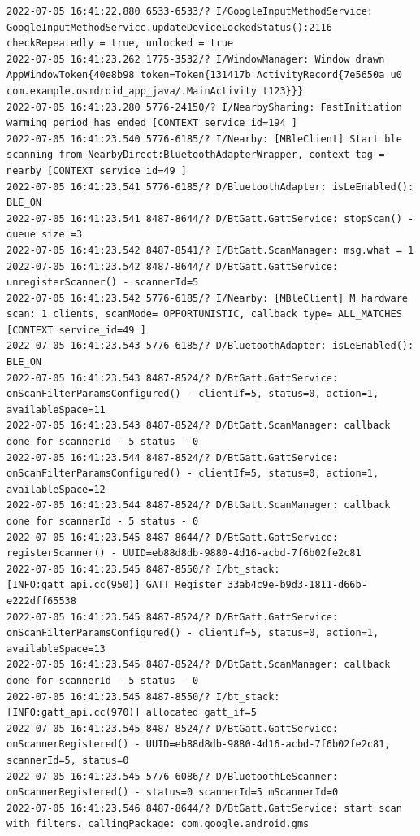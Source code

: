 \documentclass[a4paper,12pt]{book}
\begin{document}
\begin{lstlisting}
2022-07-05 16:41:22.880 6533-6533/? I/GoogleInputMethodService: GoogleInputMethodService.updateDeviceLockedStatus():2116 checkRepeatedly = true, unlocked = true
2022-07-05 16:41:23.262 1775-3532/? I/WindowManager: Window drawn AppWindowToken{40e8b98 token=Token{131417b ActivityRecord{7e5650a u0 com.example.osmdroid_app_java/.MainActivity t123}}}
2022-07-05 16:41:23.280 5776-24150/? I/NearbySharing: FastInitiation warming period has ended [CONTEXT service_id=194 ]
2022-07-05 16:41:23.540 5776-6185/? I/Nearby: [MBleClient] Start ble scanning from NearbyDirect:BluetoothAdapterWrapper, context tag = nearby [CONTEXT service_id=49 ]
2022-07-05 16:41:23.541 5776-6185/? D/BluetoothAdapter: isLeEnabled(): BLE_ON
2022-07-05 16:41:23.541 8487-8644/? D/BtGatt.GattService: stopScan() - queue size =3
2022-07-05 16:41:23.542 8487-8541/? I/BtGatt.ScanManager: msg.what = 1
2022-07-05 16:41:23.542 8487-8644/? D/BtGatt.GattService: unregisterScanner() - scannerId=5
2022-07-05 16:41:23.542 5776-6185/? I/Nearby: [MBleClient] M hardware scan: 1 clients, scanMode= OPPORTUNISTIC, callback type= ALL_MATCHES [CONTEXT service_id=49 ]
2022-07-05 16:41:23.543 5776-6185/? D/BluetoothAdapter: isLeEnabled(): BLE_ON
2022-07-05 16:41:23.543 8487-8524/? D/BtGatt.GattService: onScanFilterParamsConfigured() - clientIf=5, status=0, action=1, availableSpace=11
2022-07-05 16:41:23.543 8487-8524/? D/BtGatt.ScanManager: callback done for scannerId - 5 status - 0
2022-07-05 16:41:23.544 8487-8524/? D/BtGatt.GattService: onScanFilterParamsConfigured() - clientIf=5, status=0, action=1, availableSpace=12
2022-07-05 16:41:23.544 8487-8524/? D/BtGatt.ScanManager: callback done for scannerId - 5 status - 0
2022-07-05 16:41:23.545 8487-8644/? D/BtGatt.GattService: registerScanner() - UUID=eb88d8db-9880-4d16-acbd-7f6b02fe2c81
2022-07-05 16:41:23.545 8487-8550/? I/bt_stack: [INFO:gatt_api.cc(950)] GATT_Register 33ab4c9e-b9d3-1811-d66b-e222dff65538
2022-07-05 16:41:23.545 8487-8524/? D/BtGatt.GattService: onScanFilterParamsConfigured() - clientIf=5, status=0, action=1, availableSpace=13
2022-07-05 16:41:23.545 8487-8524/? D/BtGatt.ScanManager: callback done for scannerId - 5 status - 0
2022-07-05 16:41:23.545 8487-8550/? I/bt_stack: [INFO:gatt_api.cc(970)] allocated gatt_if=5
2022-07-05 16:41:23.545 8487-8524/? D/BtGatt.GattService: onScannerRegistered() - UUID=eb88d8db-9880-4d16-acbd-7f6b02fe2c81, scannerId=5, status=0
2022-07-05 16:41:23.545 5776-6086/? D/BluetoothLeScanner: onScannerRegistered() - status=0 scannerId=5 mScannerId=0
2022-07-05 16:41:23.546 8487-8644/? D/BtGatt.GattService: start scan with filters. callingPackage: com.google.android.gms

\end{lstlisting}
\end{document}

